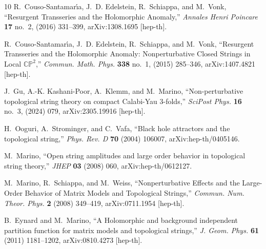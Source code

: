 \documentclass[a4paper,12pt,justification=centering]{article}
\numberwithin{equation}{section}
\providecommand{\href}[2]{#2}
\theoremstyle{plain}%
\theoremstyle{definition}
\begin{document}
\begin{thebibliography}{10}
R.~Couso-Santamar\'\i{}a, J.~D. Edelstein, R.~Schiappa, and M.~Vonk,
  ``{Resurgent Transseries and the Holomorphic Anomaly},''
  \href{http://dx.doi.org/10.1007/s00023-015-0407-z}{{\em Annales Henri
  Poincare} {\bfseries 17} no.~2, (2016) 331--399},
  \href{http://arxiv.org/abs/1308.1695}{{\ttfamily arXiv:1308.1695 [hep-th]}}.

R.~Couso-Santamar\'\i{}a, J.~D. Edelstein, R.~Schiappa, and M.~Vonk,
  ``{Resurgent Transseries and the Holomorphic Anomaly: Nonperturbative Closed
  Strings in Local ${\mathbb{C}\mathbb{P}^2}$},''
  \href{http://dx.doi.org/10.1007/s00220-015-2358-0}{{\em Commun. Math. Phys.}
  {\bfseries 338} no.~1, (2015) 285--346},
  \href{http://arxiv.org/abs/1407.4821}{{\ttfamily arXiv:1407.4821 [hep-th]}}.

J.~Gu, A.-K. Kashani-Poor, A.~Klemm, and M.~Marino, ``{Non-perturbative
  topological string theory on compact Calabi-Yau 3-folds},''
  \href{http://dx.doi.org/10.21468/SciPostPhys.16.3.079}{{\em SciPost Phys.}
  {\bfseries 16} no.~3, (2024) 079},
  \href{http://arxiv.org/abs/2305.19916}{{\ttfamily arXiv:2305.19916
  [hep-th]}}.

H.~Ooguri, A.~Strominger, and C.~Vafa, ``{Black hole attractors and the
  topological string},''
  \href{http://dx.doi.org/10.1103/PhysRevD.70.106007}{{\em Phys. Rev. D}
  {\bfseries 70} (2004) 106007},
  \href{http://arxiv.org/abs/hep-th/0405146}{{\ttfamily arXiv:hep-th/0405146}}.

M.~Marino, ``{Open string amplitudes and large order behavior in topological
  string theory},'' \href{http://dx.doi.org/10.1088/1126-6708/2008/03/060}{{\em
  JHEP} {\bfseries 03} (2008) 060},
  \href{http://arxiv.org/abs/hep-th/0612127}{{\ttfamily arXiv:hep-th/0612127}}.

M.~Marino, R.~Schiappa, and M.~Weiss, ``{Nonperturbative Effects and the
  Large-Order Behavior of Matrix Models and Topological Strings},''
  \href{http://dx.doi.org/10.4310/CNTP.2008.v2.n2.a3}{{\em Commun. Num. Theor.
  Phys.} {\bfseries 2} (2008) 349--419},
  \href{http://arxiv.org/abs/0711.1954}{{\ttfamily arXiv:0711.1954 [hep-th]}}.

B.~Eynard and M.~Marino, ``{A Holomorphic and background independent partition
  function for matrix models and topological strings},''
  \href{http://dx.doi.org/10.1016/j.geomphys.2010.11.012}{{\em J. Geom. Phys.}
  {\bfseries 61} (2011) 1181--1202},
  \href{http://arxiv.org/abs/0810.4273}{{\ttfamily arXiv:0810.4273 [hep-th]}}.


\end{thebibliography}
\end{document}
